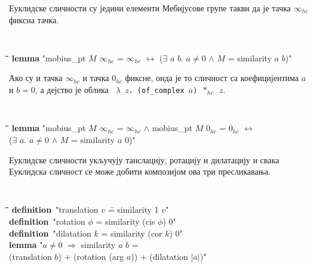 Еуклидске сличности су једини елементи Мебијусове групе такви да је
тачка $\infty_{hc}$ фиксна тачка.  {\tt
\begin{tabbing}
\hspace{5mm}\=\hspace{5mm}\=\hspace{5mm}\=\hspace{5mm}\=\hspace{5mm}\=\kill
{\bf lemma} "mobius\_pt $M$ $\infty_{hc}$ = $\infty_{hc}$ $\longleftrightarrow$ ($\exists$ $a$ $b$. $a \neq 0$ $\wedge$ $M$ = similarity $a$ $b$)"
\end{tabbing}
}

Ако су и тачка $\infty_{hc}$ и тачка $0_{hc}$ фиксне, онда је то
сличност са коефицијентима $a$ и $b=0$, а дејство је облика {\tt
  $\lambda$ $z$. (of\_complex $a$) $*_{hc}$ $z$}.

{\tt
\begin{tabbing}
  \hspace{5mm}\=\hspace{5mm}\=\hspace{5mm}\=\hspace{5mm}\=\hspace{5mm}\=\kill
  {\bf lemma} "mobius\_pt $M$ $\infty_{hc}$ = $\infty_{hc}$ $\wedge$ mobius\_pt $M$ $0_{hc}$ = $0_{hc}$ $\longleftrightarrow$ \\
\>($\exists$ $a$. $a \neq 0$ $\wedge$ $M$ = similarity $a$ $0$)"
\end{tabbing}
}

Еуклидске сличности укључују танслацију, ротацију и дилатацију и свака
Еуклидска сличност се може добити композијом ова три пресликавања.
{\tt
\begin{tabbing}
\hspace{5mm}\=\hspace{5mm}\=\hspace{5mm}\=\hspace{5mm}\=\hspace{5mm}\=\kill
{\bf definition}\ "translation $v$ \== similarity 1 $v$"\\
{\bf definition}\ "rotation $\phi$ \>= similarity (cis $\phi$) 0"\\
{\bf definition}\ "dilatation $k$ \>= similarity (cor $k$) 0"\\
{\bf lem}\={\bf ma} "$a \neq 0$ $\Longrightarrow$ similarity $a$ $b$ = \\
\>(translation $b$) + (rotation (arg $a$)) + (dilatation $|a|$)"
\end{tabbing}
}

